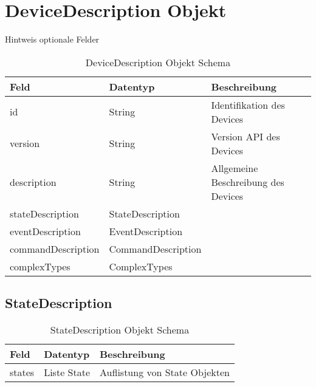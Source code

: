 \section{DeviceDescription Objekt}

Hintweis optionale Felder

\begin{table}[h!]
\begin{tabularx}{\textwidth}{|l|l|X|}

 \hline
 {\bf Feld } & {\bf Datentyp } & {\bf Beschreibung } \\  \hline

 id  &   String   & Identifikation des Devices   \\ \hline

 version & String & Version API des Devices \\ \hline

 description & String & Allgemeine Beschreibung des Devices \\ \hline 
 
 stateDescription  &   StateDescription    &     \\ \hline
 
 eventDescription  &   EventDescription    &     \\ \hline
  
 commandDescription  &   CommandDescription    &     \\ \hline
 
 complexTypes  &   ComplexTypes    &     \\ \hline
 
\end{tabularx}
\caption{DeviceDescription Objekt Schema}
\end{table}

\subsection{StateDescription}
\begin{table}[h!]
\begin{tabularx}{\textwidth}{|l|l|X|}

 \hline
 {\bf Feld } & {\bf Datentyp } & {\bf Beschreibung } \\  \hline

 states  &   Liste State   & Auflistung von State Objekten   \\ \hline

\end{tabularx}
\caption{StateDescription Objekt Schema}
\end{table}

